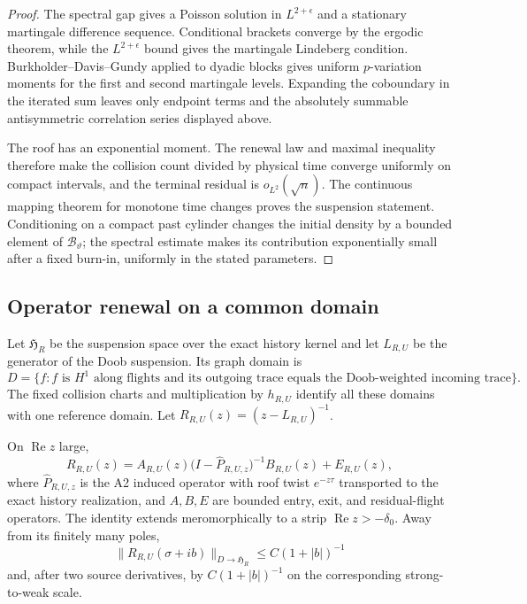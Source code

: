 \begin{proof}
The spectral gap gives a Poisson solution in $L^{2+\epsilon}$ and a stationary
martingale difference sequence.  Conditional brackets converge by the
ergodic theorem, while the $L^{2+\epsilon}$ bound gives the martingale
Lindeberg condition.  Burkholder--Davis--Gundy applied to dyadic blocks gives
uniform $p$-variation moments for the first and second martingale levels.
Expanding the coboundary in the iterated sum leaves only endpoint terms and the
absolutely summable antisymmetric correlation series displayed above.

The roof has an exponential moment.  The renewal law and maximal inequality
therefore make the collision count divided by physical time converge
uniformly on compact intervals, and the terminal residual is
$o_{L^2}(\sqrt n)$.  The continuous mapping theorem for monotone time changes
proves the suspension statement.  Conditioning on a compact past cylinder
changes the initial density by a bounded element of $\mathcal B_\vartheta$;
the spectral estimate makes its contribution exponentially small after a
fixed burn-in, uniformly in the stated parameters.
\end{proof}

\subsection{Operator renewal on a common domain}

Let $\mathfrak H_R$ be the suspension space over the exact history kernel and
let $L_{R,U}$ be the generator of the Doob suspension.  Its graph domain is
\[
 D=\{f:f\text{ is }H^1\text{ along flights and its outgoing trace equals the
 Doob-weighted incoming trace}\}.
\]
The fixed collision charts and multiplication by $h_{R,U}$ identify all these
domains with one reference domain.  Let $R_{R,U}(z)=(z-L_{R,U})^{-1}$.

\begin{theorem}
\label{thm:r21-a4-renewal}
On $\operatorname{Re}z$ large,
\[
 R_{R,U}(z)=A_{R,U}(z)
 \bigl(I-\widehat P_{R,U,z}\bigr)^{-1}B_{R,U}(z)+E_{R,U}(z),
\]
where $\widehat P_{R,U,z}$ is the A2 induced operator with roof twist
$e^{-z\tau}$ transported to the exact history realization, and $A,B,E$ are
bounded entry, exit, and residual-flight operators.  The identity extends
meromorphically to a strip $\operatorname{Re}z>-\delta_0$.  Away from its
finitely many poles,
\[
 \|R_{R,U}(\sigma+ib)\|_{D\to\mathfrak H_R}
 \le C(1+|b|)^{-1}
\]
and, after two source derivatives, by $C(1+|b|)^{-1}$ on the corresponding
strong-to-weak scale.
\end{theorem}

